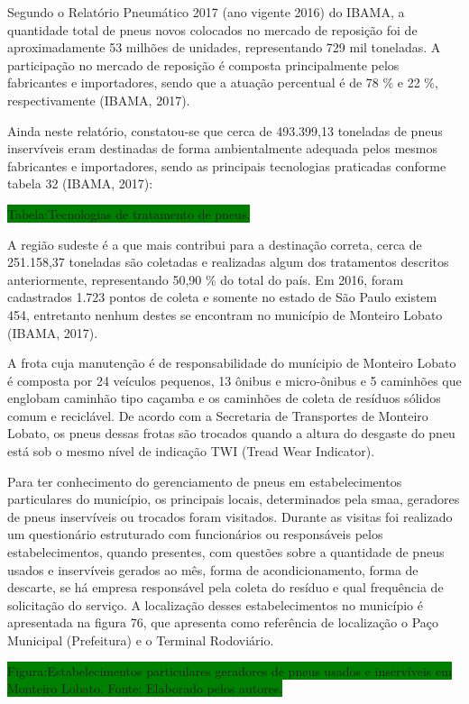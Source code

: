 \begin{description}
		Segundo o Relatório Pneumático 2017 (ano vigente 2016) do IBAMA, a quantidade total de pneus novos colocados no mercado de reposição foi de aproximadamente 53 milhões de unidades, representando 729 mil toneladas. A participação no mercado de reposição é composta principalmente pelos fabricantes e importadores, sendo que a atuação percentual é de 78 \% e 22 \%, respectivamente (IBAMA, 2017).
	
		Ainda neste relatório, constatou-se que cerca de 493.399,13 toneladas de pneus inservíveis eram destinadas de forma ambientalmente adequada pelos mesmos fabricantes e importadores, sendo as principais tecnologias praticadas conforme tabela 32 (IBAMA, 2017):	
	
	\colorbox{green}{Tabela:Tecnologias de tratamento de pneus.}
	
		A região sudeste é a que mais contribui para a destinação correta, cerca de 251.158,37 toneladas são coletadas e realizadas algum dos tratamentos descritos anteriormente, representando 50,90 \% do total do país. Em 2016, foram cadastrados 1.723 pontos de coleta e somente no estado de São Paulo existem 454, entretanto nenhum destes se encontram no município de Monteiro Lobato (IBAMA, 2017).

		A frota cuja manutenção é de responsabilidade do munícipio de Monteiro Lobato é composta por 24 veículos pequenos, 13 ônibus e micro-ônibus e 5 caminhões que englobam caminhão tipo caçamba e os caminhões de coleta de resíduos sólidos comum e reciclável. De acordo com a Secretaria de Transportes de Monteiro Lobato, os pneus dessas frotas são trocados quando a altura do desgaste do pneu está sob o mesmo nível de indicação TWI (Tread Wear Indicator).
	
		Para ter conhecimento do gerenciamento de pneus em estabelecimentos particulares do município, os principais locais, determinados pela \gls{smaa}, geradores de pneus inservíveis ou trocados foram visitados. Durante as visitas foi realizado um questionário estruturado com funcionários ou responsáveis pelos estabelecimentos, quando presentes, com questões sobre a quantidade de pneus usados e inservíveis gerados ao mês, forma de acondicionamento, forma de descarte, se há empresa responsável pela coleta do resíduo e qual frequência de solicitação do serviço. A localização desses estabelecimentos no município é apresentada na figura 76, que apresenta como referência de localização o Paço Municipal (Prefeitura) e o Terminal Rodoviário.
	
	\colorbox{green}{Figura:Estabelecimentos particulares geradores de pneus usados e inservíveis em Monteiro Lobato. Fonte: Elaborado pelos autores.}
	

\end{description}
